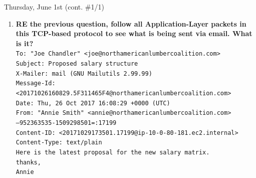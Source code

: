 \documentclass[11pt]{article}
\newcommand\codebox[1]{
    \noindent\hspace{-0.25em}\begin{tcolorbox}[on line, hbox, colback = codeblack, colframe = codeborder, coltext = white, boxrule = 1.5pt, left = 2pt, right = 2pt, top = 0.5pt, bottom = 0.5pt]
    \small\texttt{#1}\normalsize
    \end{tcolorbox}\hspace{-0.25em}
}
\begin{document}
\begin{bloodorangebox}{Thursday, June 1st \hspace{0.2cm}(cont. \#1/1)\vspace{-2.2em}\begin{flushright}\large {}\end{flushright}}
\begin{itemize}
\begin{enumerate}
            \vspace{-1em}
            Over HTTP, packets' ``info" section all start with either \texttt{GET}, \texttt{HTTP}, or \texttt{POST}: the user clicking hyperlinks, the mail server loading those pages (\textbackslash\texttt{webmail}), and the user posting mail (\textbackslash\texttt{compose.php}) in php. When user sends mail to others, SMTP (Simple Mail Transfer Protocol) is used. This was discovered using \codebox{ip.addr == 10.0.0.41 \&\& smtp}, and following the TCP Stream of any packet.
            \item \textbf{RE the previous question, follow all Application-Layer packets in this TCP-based protocol to see what is being sent via email. What is it?} \\
        
            \vspace{-1em}
            \scriptsize{\texttt{To: "Joe Chandler" <joe@northamericanlumbercoalition.com> \\
            Subject: Proposed salary structure \\
            X-Mailer: mail (GNU Mailutils 2.99.99) \\
            Message-Id: <20171026160829.5F311465F4@northamericanlumbercoalition.com> \\
            Date: Thu, 26 Oct 2017 16:08:29 +0000 (UTC) \\
            From: "Annie Smith" <annie@northamericanlumbercoalition.com>\\
            --952363535-1509298501=:17199 \\
            Content-ID: <20171029173501.17199@ip-10-0-80-181.ec2.internal> \\
            Content-Type: text/plain\\
            Here is the latest proposal for the new salary matrix. \\
            thanks,\\
            Annie}}
        \end{enumerate}
    \end{itemize}
\end{bloodorangebox}

\begin{center}
    \vspace{-0.25em}
    \hspace{0.2cm}
    \vspace{-0.4em}
\end{center}
\end{document}
